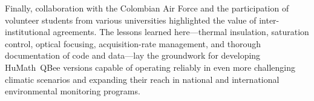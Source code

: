 \noindent Finally, collaboration with the Colombian Air Force and the participation of volunteer students from various universities highlighted the value of inter-institutional agreements. The lessons learned here—thermal insulation, saturation control, optical focusing, acquisition-rate management, and thorough documentation of code and data—lay the groundwork for developing HuMath\textregistered~QBee versions capable of operating reliably in even more challenging climatic scenarios and expanding their reach in national and international environmental monitoring programs.\\
